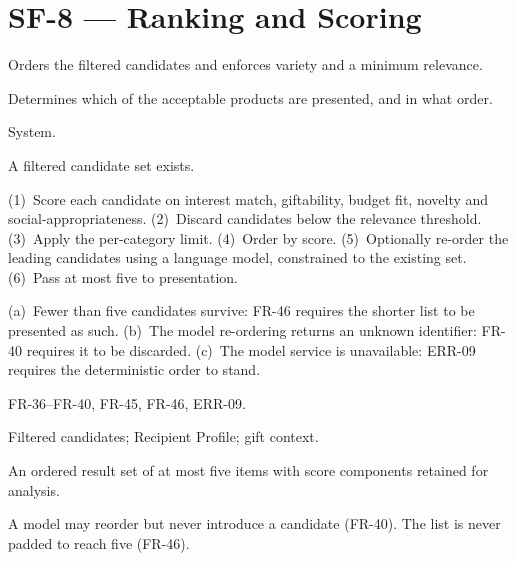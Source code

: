 \documentclass[11pt,a4paper]{report}
\begin{document}
\section{SF-8 --- Ranking and Scoring}
\begin{description}[style=nextline,leftmargin=0pt]
\item[Description] Orders the filtered candidates and enforces variety and a minimum relevance.
\item[Purpose] Determines which of the acceptable products are presented, and in what order.
\item[Actors] System.
\item[Preconditions] A filtered candidate set exists.
\item[Main flow] (1)~Score each candidate on interest match, giftability, budget fit, novelty and social-appropriateness. (2)~Discard candidates below the relevance threshold. (3)~Apply the per-category limit. (4)~Order by score. (5)~Optionally re-order the leading candidates using a language model, constrained to the existing set. (6)~Pass at most five to presentation.
\item[Alternative and exception flows] (a)~Fewer than five candidates survive: FR-46 requires the shorter list to be presented as such. (b)~The model re-ordering returns an unknown identifier: FR-40 requires it to be discarded. (c)~The model service is unavailable: ERR-09 requires the deterministic order to stand.
\item[Requirements] FR-36--FR-40, FR-45, FR-46, ERR-09.
\item[Inputs] Filtered candidates; Recipient Profile; gift context.
\item[Outputs] An ordered result set of at most five items with score components retained for analysis.
\item[Constraints] A model may reorder but never introduce a candidate (FR-40). The list is never padded to reach five (FR-46).
\end{description}
\end{document}
